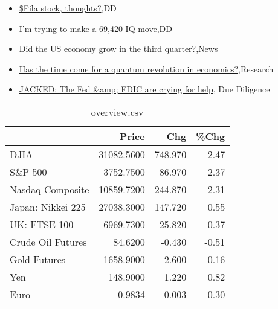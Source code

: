 \documentclass{article}%
\begin{document}
%
\begin{itemize}%
\item%
\href{https://reddit.com/r/wallstreetbets/comments/yc155q/fila\_stock\_thoughts/}{\$Fila stock, thoughts?},DD%
\item%
\href{https://reddit.com/r/wallstreetbets/comments/yc0vpo/im\_trying\_to\_make\_a\_69420\_iq\_move/}{I'm trying to make a 69,420 IQ move},DD%
\item%
\href{https://reddit.com/r/Economics/comments/ybzt6v/did\_the\_us\_economy\_grow\_in\_the\_third\_quarter/}{Did the US economy grow in the third quarter?},News%
\item%
\href{https://reddit.com/r/Economics/comments/ybxbt1/has\_the\_time\_come\_for\_a\_quantum\_revolution\_in/}{Has the time come for a quantum revolution in economics?},Research%
\item%
\href{https://reddit.com/r/Superstonk/comments/yc0jcv/jacked\_the\_fed\_fdic\_are\_crying\_for\_help/}{JACKED: The Fed \&amp; FDIC are crying for help}, Due Diligence%
\end{itemize}%


\begin{table}[htbp]%
\caption{overview.csv}%
\centering%
\begin{adjustbox}{width=1\textwidth}%
\begin{tabular}{lrrr}
\toprule
                  &      Price &     Chg &  \%Chg \\
\midrule
             DJIA & 31082.5600 & 748.970 &  2.47 \\
          S\&P 500 &  3752.7500 &  86.970 &  2.37 \\
 Nasdaq Composite & 10859.7200 & 244.870 &  2.31 \\
Japan: Nikkei 225 & 27038.3000 & 147.720 &  0.55 \\
     UK: FTSE 100 &  6969.7300 &  25.820 &  0.37 \\
Crude Oil Futures &    84.6200 &  -0.430 & -0.51 \\
     Gold Futures &  1658.9000 &   2.600 &  0.16 \\
              Yen &   148.9000 &   1.220 &  0.82 \\
             Euro &     0.9834 &  -0.003 & -0.30 \\
\bottomrule
\end{tabular}
%
\end{adjustbox}%
\end{table}

%
\end{document}
